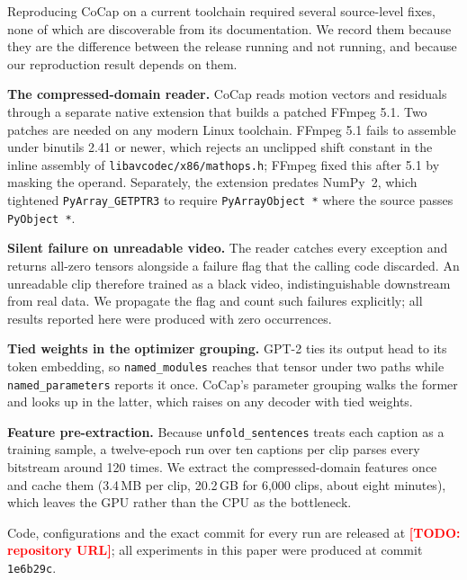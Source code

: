 \documentclass[10pt,twocolumn,letterpaper]{article}
\newcommand{\TODO}[1]{\textcolor{red}{\textbf{[TODO: #1]}}}
\begin{document}
Reproducing CoCap on a current toolchain required several source-level fixes, none of which are
discoverable from its documentation. We record them because they are the difference between the
release running and not running, and because our reproduction result depends on them.

\textbf{The compressed-domain reader.} CoCap reads motion vectors and residuals through a
separate native extension that builds a patched FFmpeg 5.1. Two patches are needed on any modern
Linux toolchain. FFmpeg 5.1 fails to assemble under binutils 2.41 or newer, which rejects an
unclipped shift constant in the inline assembly of \texttt{libavcodec/x86/mathops.h}; FFmpeg
fixed this after 5.1 by masking the operand. Separately, the extension predates NumPy~2, which
tightened \texttt{PyArray\_GETPTR3} to require \texttt{PyArrayObject~*} where the source passes
\texttt{PyObject~*}.

\textbf{Silent failure on unreadable video.} The reader catches every exception and returns
all-zero tensors alongside a failure flag that the calling code discarded. An unreadable clip
therefore trained as a black video, indistinguishable downstream from real data. We propagate the
flag and count such failures explicitly; all results reported here were produced with zero
occurrences.

\textbf{Tied weights in the optimizer grouping.} GPT-2 ties its output head to its token
embedding, so \texttt{named\_modules} reaches that tensor under two paths while
\texttt{named\_parameters} reports it once. CoCap's parameter grouping walks the former and looks
up in the latter, which raises on any decoder with tied weights.

\textbf{Feature pre-extraction.} Because \texttt{unfold\_sentences} treats each caption as a
training sample, a twelve-epoch run over ten captions per clip parses every bitstream around 120
times. We extract the compressed-domain features once and cache them (3.4\,MB per clip, 20.2\,GB
for 6,000 clips, about eight minutes), which leaves the GPU rather than the CPU as the
bottleneck.

Code, configurations and the exact commit for every run are released at
\TODO{repository URL}; all experiments in this paper were produced at commit
\texttt{1e6b29c}.



\end{document}
